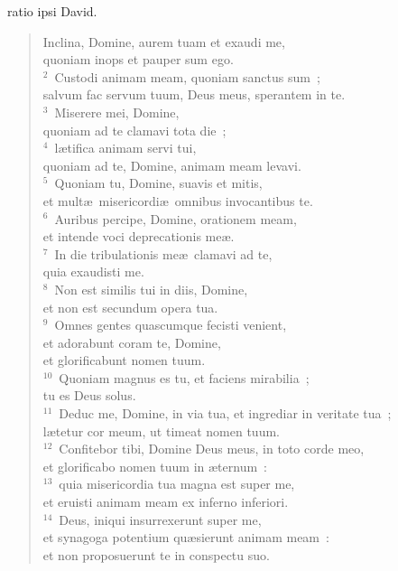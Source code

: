 \bchapter
{}ratio ipsi David. \begin{flushleft}\begin{verse}\vspace{6pt}Inclina, Domine, aurem tuam et exaudi me,\\ quoniam inops et pauper sum ego.\\
${}^{2}$~Custodi animam meam, quoniam sanctus sum~;\\ salvum fac servum tuum, Deus meus, sperantem in te.\\
${}^{3}$~Miserere mei, Domine,\\ quoniam ad te clamavi tota die~;\\
${}^{4}$~l\ae tifica animam servi tui,\\ quoniam ad te, Domine, animam meam levavi.\\
${}^{5}$~Quoniam tu, Domine, suavis et mitis,\\ et mult\ae\ misericordi\ae\ omnibus invocantibus te.\\
${}^{6}$~Auribus percipe, Domine, orationem meam,\\ et intende voci deprecationis me\ae .\\
${}^{7}$~In die tribulationis me\ae\ clamavi ad te,\\ quia exaudisti me.\\
${}^{8}$~Non est similis tui in diis, Domine,\\ et non est secundum opera tua.\\
${}^{9}$~Omnes gentes quascumque fecisti venient,\\ et adorabunt coram te, Domine,\\ et glorificabunt nomen tuum.\\
${}^{10}$~Quoniam magnus es tu, et faciens mirabilia~;\\ tu es Deus solus.\\
${}^{11}$~Deduc me, Domine, in via tua, et ingrediar in veritate tua~;\\ l\ae tetur cor meum, ut timeat nomen tuum.\\
${}^{12}$~Confitebor tibi, Domine Deus meus, in toto corde meo,\\ et glorificabo nomen tuum in \ae ternum~:\\
${}^{13}$~quia misericordia tua magna est super me,\\ et eruisti animam meam ex inferno inferiori.\\
${}^{14}$~Deus, iniqui insurrexerunt super me,\\ et synagoga potentium qu\ae sierunt animam meam~:\\ et non proposuerunt te in conspectu suo.\\

\end{verse}
\end{flushleft}
